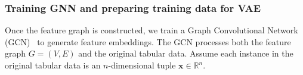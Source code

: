 






\subsubsection{\textbf{Training GNN and preparing training data for VAE}}

Once the feature graph is constructed, we train a Graph Convolutional Network (GCN)~\cite{zhang2019graph} to generate feature embeddings. 
The GCN processes both the feature graph \( G = (V, E) \) and the original tabular data. Assume each instance in the original tabular data is an \( n \)-dimensional tuple \( \mathbf{x} \in \mathbb{R}^n \).

